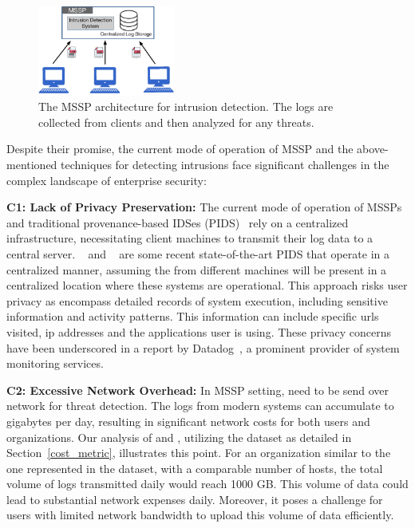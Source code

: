\begin{figure}[t!]
    \centering
    \includegraphics[width=0.4\textwidth]{fig/mssp.pdf}
    \caption{The MSSP architecture for intrusion detection. The logs are collected from clients and then analyzed for any threats.}
    \label{mssp}
    \vspace{-2ex}
  \end{figure}  

Despite their promise, the current mode of operation of MSSP and the above-mentioned techniques for detecting intrusions face significant challenges in the complex landscape of enterprise security:

\smallskip
\noindent
\textbf{C1: Lack of Privacy Preservation:} The current mode of operation of MSSPs and traditional provenance-based IDSes (PIDS)~\cite{flash2024,cheng2023kairos,wang2022threatrace} rely on a centralized infrastructure, necessitating client machines to transmit their log data to a central server. \flash~\cite{flash2024} and \kairos~\cite{cheng2023kairos} are some recent state-of-the-art PIDS that operate in a centralized manner, assuming the \logs from different machines will be present in a centralized location where these systems are operational. This approach risks user privacy as \logs encompass detailed records of system execution, including sensitive information and activity patterns. This information can include specific urls visited, ip addresses and the applications user is using. These privacy concerns have been underscored in a report by Datadog~\cite{datadog}, a prominent provider of system monitoring services.
    
\smallskip
\noindent
\textbf{C2: Excessive Network Overhead:} In MSSP setting, \logs need to be send over network for threat detection. The logs from modern systems can accumulate to gigabytes per day, resulting in significant network costs for both users and organizations. Our analysis of \flash and \kairos, utilizing the \optc dataset as detailed in Section~\ref{cost_metric}, illustrates this point. For an organization similar to the one represented in the \optc dataset, with a comparable number of hosts, the total volume of logs transmitted daily would reach 1000 GB. This volume of data could lead to substantial network expenses daily. Moreover, it poses a challenge for users with limited network bandwidth to upload this volume of data efficiently.
    
